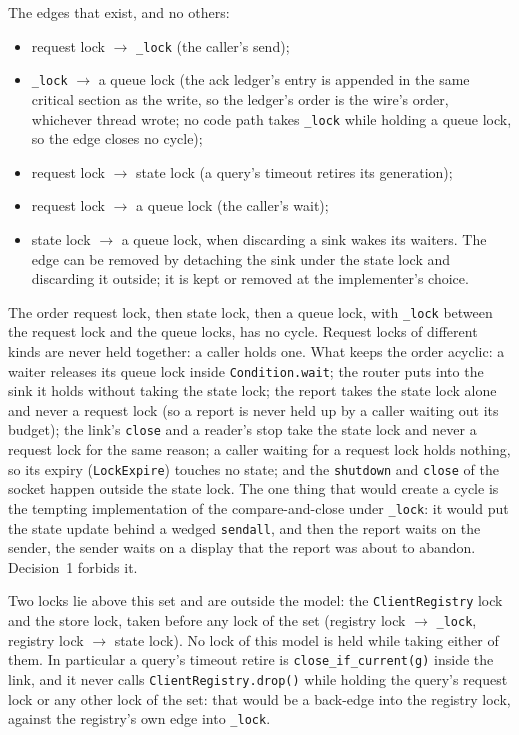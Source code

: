 \documentclass[a4paper,10pt,fleqn]{article}
\begin{document}
The edges that exist, and no others:
\begin{itemize}
  \item request lock $\to$ \texttt{\_lock} (the caller's send);
  \item \texttt{\_lock} $\to$ a queue lock (the ack ledger's entry is appended in
    the same critical section as the write, so the ledger's order is the
    wire's order, whichever thread wrote; no code path takes \texttt{\_lock}
    while holding a queue lock, so the edge closes no cycle);
  \item request lock $\to$ state lock (a query's timeout retires its
    generation);
  \item request lock $\to$ a queue lock (the caller's wait);
  \item state lock $\to$ a queue lock, when discarding a sink wakes its waiters.
    The edge can be removed by detaching the sink under the state lock and
    discarding it outside; it is kept or removed at the implementer's choice.
\end{itemize}
The order request lock, then state lock, then a queue lock, with
\texttt{\_lock} between the request lock and the queue locks, has no cycle.  Request locks of
different kinds are never held together: a caller holds one.  What keeps the
order acyclic: a waiter releases its queue lock inside \texttt{Condition.wait};
the router puts into the sink it holds without taking the state lock; the
report takes the state lock alone and never a request lock (so a report is
never held up by a caller waiting out its budget); the link's \texttt{close}
and a reader's stop take the state lock and never a request lock for the same
reason; a caller waiting for a request lock holds nothing, so its expiry
(\texttt{LockExpire}) touches no state; and the \texttt{shutdown} and
\texttt{close} of the socket happen outside the state lock.  The one thing that
would create a cycle is the tempting implementation of the compare-and-close
under \texttt{\_lock}: it would put the state update behind a wedged
\texttt{sendall}, and then the report waits on the sender, the sender waits on
a display that the report was about to abandon.  Decision~1 forbids it.

Two locks lie above this set and are outside the model: the
\texttt{ClientRegistry} lock and the store lock, taken before any lock of the
set (registry lock $\to$ \texttt{\_lock}, registry lock $\to$ state lock).
No lock of this model is held while taking either of them.  In particular a
query's timeout retire is \texttt{close\_if\_current(g)} inside the link, and
it never calls \texttt{ClientRegistry.drop()} while holding the query's request
lock or any other lock of the set: that would be a back-edge into the registry
lock, against the registry's own edge into \texttt{\_lock}.
\end{document}
